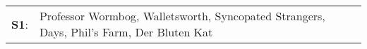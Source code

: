 \begin{supertabular}{p{0.03\textwidth}p{0.92\textwidth}}
 \textbf{S1}:  &  Professor Wormbog\textsuperscript{}, \enspace Walletsworth\textsuperscript{}, \enspace Syncopated Strangers\textsuperscript{},  Days\textsuperscript{}, \enspace Phil's Farm\textsuperscript{}, \enspace Der Bluten Kat\textsuperscript{}  \enspace  \\
\end{supertabular}
